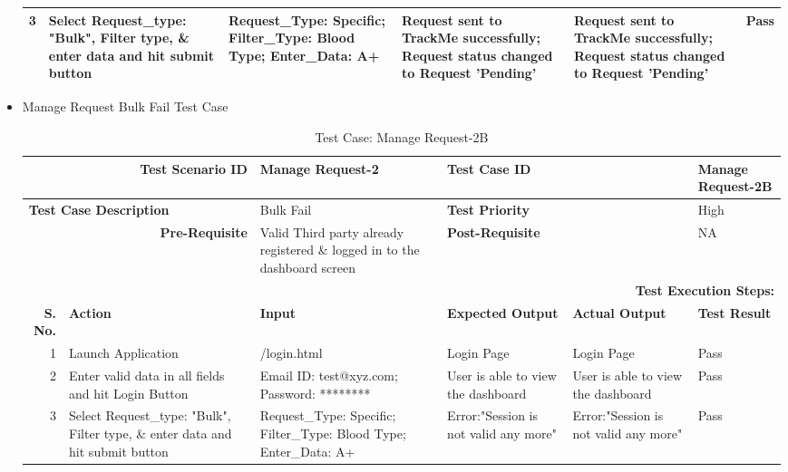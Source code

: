 \documentclass[a4paper, hidelinks, 12pt]{report}
\begin{document}
\begin{itemize}
\begin{table}[H]
\begin{tabular}{|r|p{4.355em}|p{7.715em}|p{6.43em}|p{5.855em}|p{5.07em}|}
    \midrule
    3     & Select Request\_type: "Bulk", Filter type, \& enter data and hit submit button & Request\_Type: Specific; Filter\_Type: Blood Type; Enter\_Data: A+ & Request sent to TrackMe successfully; Request status changed to Request 'Pending' & Request sent to TrackMe successfully; Request status changed to Request 'Pending' & Pass \\
    \bottomrule
    \end{tabular}%
  \label{tab:Test Case:Manage Request-2A }%
\end{table}%

\item{Manage Request Bulk Fail Test Case}
\begin{table}[H]
  \centering
  \caption{Test Case: Manage Request-2B}
    \begin{tabular}{|r|p{4.355em}|p{7.715em}|p{6.43em}|p{5.855em}|p{5.07em}|}
    \toprule
    \multicolumn{2}{|p{13.425em}|}{\textbf{Test Scenario ID}} & Manage Request-2 & \multicolumn{2}{p{12.285em}|}{\textbf{Test Case ID}} & Manage Request-2B \\
    \midrule
    \multicolumn{2}{|l|}{\multirow{2}[2]{*}{\textbf{Test Case Description}}} & \multirow{2}[2]{*}{Bulk Fail} & \multicolumn{2}{l|}{\multirow{2}[2]{*}{\textbf{Test Priority}}} & \multirow{2}[2]{*}{High} \\
    \multicolumn{2}{|l|}{} & \multicolumn{1}{l|}{} & \multicolumn{2}{l|}{} & \multicolumn{1}{l|}{} \\
    \midrule
    \multicolumn{2}{|p{13.425em}|}{\textbf{Pre-Requisite}} & Valid Third party already registered \& logged in to the dashboard screen & \multicolumn{2}{p{12.285em}|}{\textbf{Post-Requisite}} & NA \\
    \midrule
    \multicolumn{6}{p{38.495em}|}{\textbf{Test Execution Steps:}} \\
    \midrule
    \multicolumn{1}{|p{5.07em}|}{\textbf{S. No.}} & \textbf{Action } & \textbf{Input} & \textbf{Expected Output} & \textbf{Actual Output} & \textbf{Test Result} \\
    \midrule
    1     & Launch Application & /login.html & Login Page & Login Page & Pass \\
    \midrule
    2     & Enter valid data in all fields and hit Login Button & Email ID: test@xyz.com; Password: ******** & User is able to view the dashboard & User is able to view the dashboard & Pass \\
    \midrule
    3     & Select Request\_type: "Bulk", Filter type, \& enter data and hit submit button & Request\_Type: Specific; Filter\_Type: Blood Type; Enter\_Data: A+ & Error:"Session is not valid any more" & Error:"Session is not valid any more" & Pass \\

\end{tabular}
\end{table}
\end{itemize}
\end{document}
